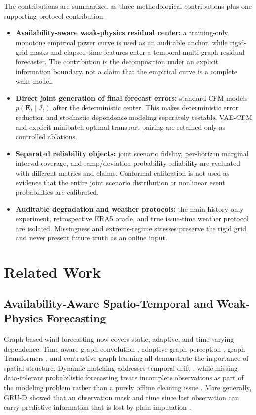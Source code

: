 \documentclass[journal]{IEEEtran}
\begin{document}
The contributions are summarized as three methodological contributions plus one supporting protocol contribution.
\begin{itemize}
\item \textbf{Availability-aware weak-physics residual center:} a training-only monotone empirical power curve is used as an auditable anchor, while rigid-grid masks and elapsed-time features enter a temporal multi-graph residual forecaster. The contribution is the decomposition under an explicit information boundary, not a claim that the empirical curve is a complete wake model.
\item \textbf{Direct joint generation of final forecast errors:} standard CFM models $p(\bm E_t\mid\mathcal I_t)$ after the deterministic center. This makes deterministic error reduction and stochastic dependence modeling separately testable. VAE-CFM and explicit minibatch optimal-transport pairing are retained only as controlled ablations.
\item \textbf{Separated reliability objects:} joint scenario fidelity, per-horizon marginal interval coverage, and ramp/deviation probability reliability are evaluated with different metrics and claims. Conformal calibration is not used as evidence that the entire joint scenario distribution or nonlinear event probabilities are calibrated.
\item \textbf{Auditable degradation and weather protocols:} the main history-only experiment, retrospective ERA5 oracle, and true issue-time weather protocol are isolated. Missingness and extreme-regime stresses preserve the rigid grid and never present future truth as an online input.
\end{itemize}

\section{Related Work}

\subsection{Availability-Aware Spatio-Temporal and Weak-Physics Forecasting}

Graph-based wind forecasting now covers static, adaptive, and time-varying dependence. Time-aware graph convolution \cite{tang2024timeaware}, adaptive graph perception \cite{yang2024gcn}, graph Transformers \cite{liang2025wpformer}, and contrastive graph learning \cite{liu2025graphcontrast} all demonstrate the importance of spatial structure. Dynamic matching addresses temporal drift \cite{li2025dynamic}, while missing-data-tolerant probabilistic forecasting treats incomplete observations as part of the modeling problem rather than a purely offline cleaning issue \cite{meng2026missing}. More generally, GRU-D showed that an observation mask and time since last observation can carry predictive information that is lost by plain imputation \cite{che2018grud}.
\end{document}
